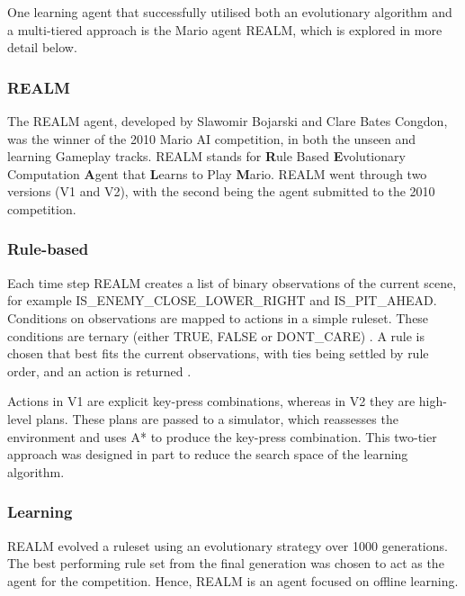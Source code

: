 \vspace{\baselineskip} \noindent
One learning agent that successfully utilised both an evolutionary algorithm and a multi-tiered approach is the Mario agent REALM, which is explored in more detail below. 

\subsubsection{REALM}
\label{ssec:realm}

The REALM agent, developed by Slawomir Bojarski and Clare Bates Congdon, was the winner of the 2010 Mario AI competition, in both the unseen and learning Gameplay tracks. REALM stands for \textbf{R}ule Based \textbf{E}volutionary Computation \textbf{A}gent that \textbf{L}earns to Play \textbf{M}ario. REALM went through two versions (V1 and V2), with the second being the agent submitted to the 2010 competition.

\subsubsection*{\hspace{6pt}Rule-based}

Each time step REALM creates a list of binary observations of the current scene, for example {\footnotesize IS\_ENEMY\_CLOSE\_LOWER\_RIGHT} and {\footnotesize IS\_PIT\_AHEAD}. Conditions on observations are mapped to actions in a simple ruleset. These conditions are ternary (either {\footnotesize TRUE}, {\footnotesize FALSE} or {\footnotesize DONT\_CARE}) \cite[p.~85]{realm}. A rule is chosen that best fits the current observations, with ties being settled by rule order, and an action is returned \cite[p.~86]{realm}.

Actions in V1 are explicit key-press combinations, whereas in V2 they are high-level plans. These plans are passed to a simulator, which reassesses the environment and uses A* to produce the key-press combination. This two-tier approach was designed in part to reduce the search space of the learning algorithm. \cite[pp.~85-87]{realm}

\subsubsection*{\hspace{6pt}Learning}

REALM evolved a ruleset using an evolutionary strategy over 1000 generations. The best performing rule set from the final generation was chosen to act as the agent for the competition. Hence, REALM is an agent focused on offline learning. \cite[pp.~87-89]{realm}

